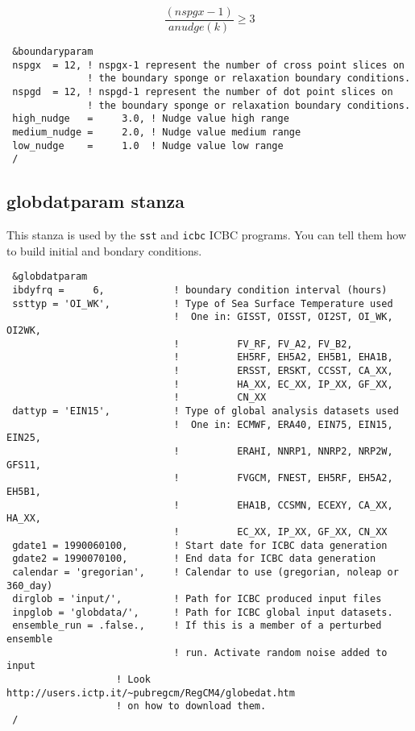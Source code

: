 \begin{equation}
\frac{(nspgx-1)}{anudge(k)} \ge 3
\end{equation}

{\footnotesize
\begin{Verbatim}
 &boundaryparam
 nspgx  = 12, ! nspgx-1 represent the number of cross point slices on
              ! the boundary sponge or relaxation boundary conditions.
 nspgd  = 12, ! nspgd-1 represent the number of dot point slices on
              ! the boundary sponge or relaxation boundary conditions.
 high_nudge   =     3.0, ! Nudge value high range
 medium_nudge =     2.0, ! Nudge value medium range
 low_nudge    =     1.0  ! Nudge value low range
 /
\end{Verbatim}
}

\subsection{globdatparam stanza}

This stanza is used by the \verb=sst= and \verb=icbc= ICBC programs. You can
tell them how to build initial and bondary conditions.

{\footnotesize
\begin{Verbatim}
 &globdatparam
 ibdyfrq =     6,            ! boundary condition interval (hours)
 ssttyp = 'OI_WK',           ! Type of Sea Surface Temperature used
                             !  One in: GISST, OISST, OI2ST, OI_WK, OI2WK,
                             !          FV_RF, FV_A2, FV_B2,
                             !          EH5RF, EH5A2, EH5B1, EHA1B,
                             !          ERSST, ERSKT, CCSST, CA_XX,
                             !          HA_XX, EC_XX, IP_XX, GF_XX,
                             !          CN_XX
 dattyp = 'EIN15',           ! Type of global analysis datasets used
                             !  One in: ECMWF, ERA40, EIN75, EIN15, EIN25,
                             !          ERAHI, NNRP1, NNRP2, NRP2W, GFS11,
                             !          FVGCM, FNEST, EH5RF, EH5A2, EH5B1,
                             !          EHA1B, CCSMN, ECEXY, CA_XX, HA_XX,
                             !          EC_XX, IP_XX, GF_XX, CN_XX
 gdate1 = 1990060100,        ! Start date for ICBC data generation
 gdate2 = 1990070100,        ! End data for ICBC data generation
 calendar = 'gregorian',     ! Calendar to use (gregorian, noleap or 360_day)
 dirglob = 'input/',         ! Path for ICBC produced input files
 inpglob = 'globdata/',      ! Path for ICBC global input datasets.
 ensemble_run = .false.,     ! If this is a member of a perturbed ensemble
                             ! run. Activate random noise added to input
                   ! Look http://users.ictp.it/~pubregcm/RegCM4/globedat.htm
                   ! on how to download them.
 /
\end{Verbatim}
}

